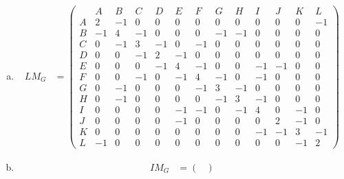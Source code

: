 \documentclass[10pt,letterpaper, cm]{hmcpset}
\begin{document}
\begin{enumerate}[(a)]

    \item 
    
    \begin{align*}

      LM_G &= \begin{pmatrix}


             & A & B & C & D & E & F & G & H & I & J & K & L \\        

         A   & 2 & -1 & 0 & 0 & 0 & 0 & 0 & 0 & 0 & 0 & 0 & -1 \\

         B   & -1 & 4 & -1 & 0 & 0 & 0 & -1 & -1 & 0 & 0 & 0 & 0\\

         C   & 0 & -1 & 3 & -1 & 0 & -1 & 0 & 0 & 0  & 0 & 0 & 0\\

         D   & 0 & 0 & -1 & 2 & -1 & 0 & 0 & 0 & 0  & 0 & 0 & 0 \\

         E   & 0 & 0 & 0 & -1 & 4 & -1 & 0 & 0 & -1 & -1 & 0 & 0\\

         F   & 0 & 0 & -1 & 0 & -1 & 4 & -1 & 0 & -1 & 0 & 0 & 0 \\

         G   & 0 & -1 & 0 & 0 & 0 & -1 & 3 & -1 & 0 & 0 & 0 & 0\\

         H   & 0 & -1 & 0 & 0 & 0 & 0 & -1 & 3 & -1 & 0 & 0 & 0\\

         I   & 0 & 0 & 0 & 0 & -1 & -1 & 0 & -1 & 4 & 0 & -1 & 0\\
          
         J   & 0 & 0 & 0 & 0 & -1 & 0 & 0 & 0 & 0 & 2 & -1 & 0 \\

         K   & 0 & 0 & 0 & 0 & 0 & 0 & 0 & 0 & -1 & -1 & 3 & -1 \\

         L   & -1 & 0 & 0 & 0 & 0 & 0 & 0 & 0 & 0 & 0 & -1 & 2
      \end{pmatrix}  
              \end{align*}
    \item 
    
    \begin{align*}

      IM_G &= \begin{pmatrix}



\end{pmatrix}
\end{align*}
\end{enumerate}
\end{document}
